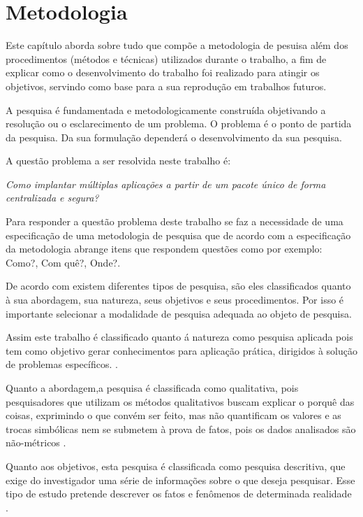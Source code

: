 \chapter{Metodologia}
\label{cap-metodologia}

Este capítulo aborda sobre tudo que compõe a metodologia de pesuisa além dos
procedimentos (métodos e técnicas) utilizados durante o trabalho, a fim de
explicar como o desenvolvimento do trabalho foi realizado para atingir os objetivos,
servindo como base para a sua reprodução em trabalhos futuros.

A pesquisa é fundamentada e metodologicamente construída objetivando a resolução
ou o esclarecimento de um problema. O problema é o ponto de partida da pesquisa.
Da sua formulação dependerá o desenvolvimento da sua pesquisa.
\cite{moresi2003metodologia}

A questão problema a ser resolvida neste trabalho é:

\begin{center}
  \textit{
  Como implantar múltiplas aplicações a partir de um pacote único
  de forma centralizada e segura?
}
\end{center}

Para responder a questão problema deste trabalho se faz a necessidade de uma especificação
de uma metodologia de pesquisa que de acordo com \cite{marconi2002tecnicas} a
especificação da metodologia abrange itens que respondem questões como por
exemplo: Como?, Com quê?, Onde?.

De acordo com \cite{gerhardt2009metodos} existem diferentes tipos de pesquisa,
são eles classificados quanto à sua abordagem, sua natureza, seus objetivos e
seus procedimentos. Por isso é importante selecionar a modalidade de pesquisa
adequada ao objeto de pesquisa.

Assim este trabalho é classificado  quanto á natureza como pesquisa aplicada
pois tem como objetivo gerar conhecimentos para aplicação prática, dirigidos à
solução de problemas específicos. \cite{gerhardt2009metodos}.

Quanto a abordagem,a pesquisa é classificada como qualitativa, pois pesquisadores que utilizam os
métodos qualitativos buscam explicar o porquê das coisas, exprimindo o que convém
ser feito, mas não quantificam os valores e as trocas simbólicas nem se submetem
à prova de fatos, pois os dados analisados são não-métricos \cite{gerhardt2009metodos}.

Quanto aos objetivos, esta pesquisa é classificada como pesquisa descritiva, que
exige do investigador uma série de informações sobre o que deseja pesquisar.
Esse tipo de estudo pretende descrever os fatos e fenômenos de determinada realidade
\cite{trivinos1987introduccao}.


